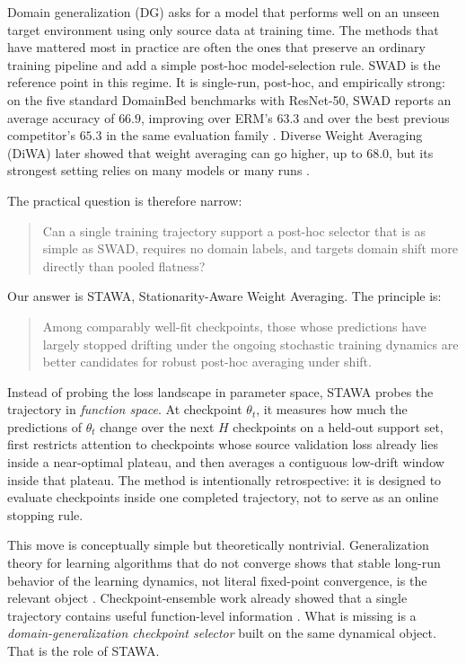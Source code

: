 \documentclass{article}
\newcommand{\stawa}{\textup{\textsc{STAWA}}}
\newcommand{\swad}{\textup{\textsc{SWAD}}}
\begin{document}
Domain generalization (DG) asks for a model that performs well on an unseen target environment using only source data at training time. The methods that have mattered most in practice are often the ones that preserve an ordinary training pipeline and add a simple post-hoc model-selection rule. \swad{} \citep{cha2021wad} is the reference point in this regime. It is single-run, post-hoc, and empirically strong: on the five standard DomainBed benchmarks with ResNet-50, \swad{} reports an average accuracy of $66.9$, improving over ERM's $63.3$ and over the best previous competitor's $65.3$ in the same evaluation family \citep{cha2021wad}. Diverse Weight Averaging (DiWA) later showed that weight averaging can go higher, up to $68.0$, but its strongest setting relies on many models or many runs \citep{rame2022diwa}.

The practical question is therefore narrow:
\begin{quote}
Can a single training trajectory support a post-hoc selector that is as simple as \swad{}, requires no domain labels, and targets domain shift more directly than pooled flatness?
\end{quote}

Our answer is \stawa{}, Stationarity-Aware Weight Averaging. The principle is:
\begin{quote}
    Among comparably well-fit checkpoints, those whose predictions have largely stopped drifting under the ongoing stochastic training dynamics are better candidates for robust post-hoc averaging under shift.
\end{quote}
Instead of probing the loss landscape in parameter space, \stawa{} probes the trajectory in \emph{function space}. At checkpoint $\theta_t$, it measures how much the predictions of $\theta_t$ change over the next $H$ checkpoints on a held-out support set, first restricts attention to checkpoints whose source validation loss already lies inside a near-optimal plateau, and then averages a contiguous low-drift window inside that plateau. The method is intentionally retrospective: it is designed to evaluate checkpoints inside one completed trajectory, not to serve as an online stopping rule.

This move is conceptually simple but theoretically nontrivial. Generalization theory for learning algorithms that do not converge shows that stable long-run behavior of the learning dynamics, not literal fixed-point convergence, is the relevant object \citep{chandramoorthy2022nonconvergent}. Checkpoint-ensemble work already showed that a single trajectory contains useful function-level information \citep{chen2017checkpoint}. What is missing is a \emph{domain-generalization checkpoint selector} built on the same dynamical object. That is the role of \stawa{}.
\end{document}
